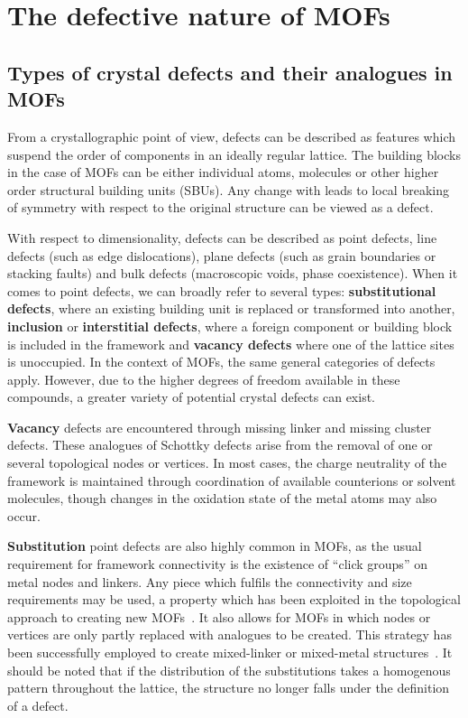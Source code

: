 
\section{The defective nature of MOFs}

\subsection{Types of crystal defects and their analogues in MOFs}

From a crystallographic point of view, defects can be described
as features which suspend the order of components in an ideally
regular lattice. The building blocks in the case of MOFs can be either
individual atoms, molecules or other higher order structural building
units (SBUs). Any change with leads to local breaking of symmetry with
respect to the original structure can be viewed as a defect.

With respect to dimensionality, defects can be described
as point defects, line defects (such as edge dislocations),
plane defects (such as grain boundaries or stacking faults) and bulk
defects (macroscopic voids, phase coexistence).
When it comes to point defects, we can broadly refer to several types:
\textbf{substitutional defects}, where an existing building unit is
replaced or transformed into another, \textbf{inclusion} or
\textbf{interstitial defects}, where a foreign component
or building block is included in the framework and \textbf{vacancy defects}
where one of the lattice sites is unoccupied.
In the context of MOFs, the same general categories of defects
apply. However, due to the higher degrees of freedom available in
these compounds, a greater variety of potential crystal defects
can exist.

\textbf{Vacancy} defects are encountered through missing linker and
missing cluster defects. These analogues of Schottky defects
arise from the removal of one or several topological nodes or vertices.
In most cases, the charge neutrality of the framework
is maintained through coordination of available counterions or solvent
molecules, though changes in the oxidation state of the metal atoms
may also occur.

\textbf{Substitution} point defects are also highly common in MOFs, as the
usual requirement for framework connectivity is the existence
of ``click groups'' on metal nodes and linkers. Any
piece which fulfils the connectivity and size requirements may
be used, a property which has been exploited in the topological
approach to creating new 
MOFs~\cite{burnettRecentAdvancesPorphyrinic2012,%
    liTopologicalAnalysisMetal2014,%
    stockSynthesisMetalOrganicFrameworks2012}.
It also allows for MOFs in which nodes or vertices are only partly
replaced with analogues to be created. This strategy has been
successfully employed to create mixed-linker or mixed-metal 
structures~\cite{buekenTacklingDefectConundrum2017,%
	dhakshinamoorthyMixedmetalMixedlinkerMetal2016}.
It should be noted that if the distribution of the substitutions takes
a homogenous pattern throughout the lattice, the structure no
longer falls under the definition of a defect.

